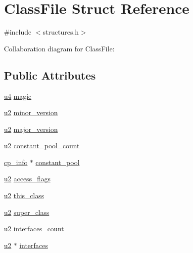 \hypertarget{structClassFile}{}\section{Class\+File Struct Reference}
\label{structClassFile}


{\ttfamily \#include $<$structures.\+h$>$}



Collaboration diagram for Class\+File\+:
\subsection*{Public Attributes}
\begin{DoxyCompactItemize}
\item 
\hyperlink{structures_8h_ae391a1d79bb0c8cbc283f0283e3c098b}{u4} \hyperlink{structClassFile_a09085e9db513dae2f46da6e0a26c1b59}{magic}
\item 
\hyperlink{structures_8h_a55ef8d87fd202b8417704c089899c5b9}{u2} \hyperlink{structClassFile_af0db7b0ea01cb9cea2cee177ca81df09}{minor\+\_\+version}
\item 
\hyperlink{structures_8h_a55ef8d87fd202b8417704c089899c5b9}{u2} \hyperlink{structClassFile_abede9cb937e65072517d0ee6e26e2757}{major\+\_\+version}
\item 
\hyperlink{structures_8h_a55ef8d87fd202b8417704c089899c5b9}{u2} \hyperlink{structClassFile_ac8fdf5cccfd632da4fdb21ae63fffa7a}{constant\+\_\+pool\+\_\+count}
\item 
\hyperlink{structcp__info}{cp\+\_\+info} $\ast$ \hyperlink{structClassFile_a2309d843091aad79aed04ce92470a434}{constant\+\_\+pool}
\item 
\hyperlink{structures_8h_a55ef8d87fd202b8417704c089899c5b9}{u2} \hyperlink{structClassFile_ae88db578147f7ee0d6fc1aeacb341854}{access\+\_\+flags}
\item 
\hyperlink{structures_8h_a55ef8d87fd202b8417704c089899c5b9}{u2} \hyperlink{structClassFile_a2d33db0a560a71b94bc572dd1e4ec03a}{this\+\_\+class}
\item 
\hyperlink{structures_8h_a55ef8d87fd202b8417704c089899c5b9}{u2} \hyperlink{structClassFile_a5f6c11c0ccb02fd992b5c102725253ec}{super\+\_\+class}
\item 
\hyperlink{structures_8h_a55ef8d87fd202b8417704c089899c5b9}{u2} \hyperlink{structClassFile_a337fcb7da33d1b64631441115c7de305}{interfaces\+\_\+count}
\item 
\hyperlink{structures_8h_a55ef8d87fd202b8417704c089899c5b9}{u2} $\ast$ \hyperlink{structClassFile_af599de97e062c98966470f1590496425}{interfaces}

\end{DoxyCompactItemize}
